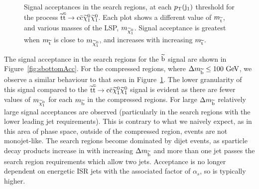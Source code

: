 \begin{figure}[ht!]
\begin{center}
  \caption{Signal acceptances in the search regions, at each $p_{\text{T}}({\rm j}_1)$ threshold for the process $\widetilde{{\rm t}} \overline{\widetilde{\mathrm{t}}} \rightarrow \rm c \bar{\rm c} \widetilde{\chi}^{0}_{1} \widetilde{\chi}^{0}_{1}$. Each plot shows a different value of $m_{\widetilde{{\rm t}}}$, and various masses of the LSP, $m_{\widetilde{\chi}^{0}_{1}}$. Signal acceptance is greatest when $m_{\widetilde{{\rm t}}}$ is close to $m_{\widetilde{\chi}^{0}_{1}}$, and increases with increasing $m_{\widetilde{{\rm t}}}$.
\label{fig:stopAcc}}
  \end{center}
\end{figure}


The signal acceptance in the search regions for the $\widetilde{{\rm b}}$ signal are shown in Figure~\ref{fig:sbottomAcc}.
For the compressed regions, where $\Delta m_{\widetilde{{\rm b}}}\leq100~\mathrm{GeV}$, we observe a similar behaviour to that seen in Figure~\ref{fig:stopAcc}.
The lower granularity of this signal compared to the $\widetilde{{\rm t}} \overline{\widetilde{\mathrm{t}}} \rightarrow \rm c \bar{\rm c} \widetilde{\chi}^{0}_{1} \widetilde{\chi}^{0}_{1}$ signal is evident as there are fewer values of $m_{\widetilde{\chi}^{0}_{1}}$ for each $m_{\widetilde{{\rm b}}}$ in the compressed regions. 
For large $\Delta m_{\widetilde{{\rm b}}}$ relatively large signal acceptances are observed (particularly in the search regions with the lower leading jet \pt{} requirements). 
This is contrary to what we naively expect, 
as in this area of phase space, outside of the compressed region, events are not monojet-like. 
The search regions become dominated by dijet events, as sparticle decay products increase in \pt{} with increasing $\Delta m_{\widetilde{{\rm b}}}$ and more than one jet passes the search region requirements which allow two jets. 
Acceptance is no longer dependent on energetic \ac{ISR} jets with the associated factor of $\alpha_{s}$, so is typically higher. 


